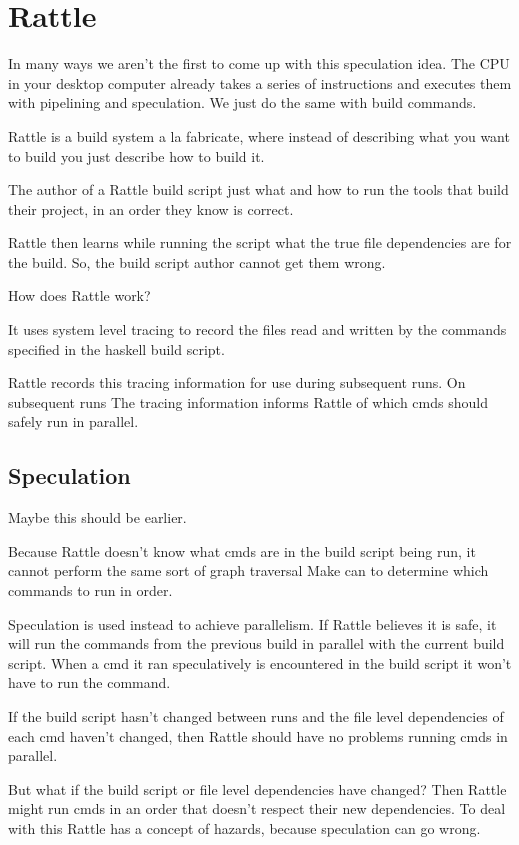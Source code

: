 \section{Rattle}
\label{sec:rattle}

In many ways we aren't the first to come up with this speculation idea. The CPU in your desktop computer already takes a series of instructions and executes them with pipelining and speculation. We just do the same with build commands.

Rattle is a build system a la fabricate, where instead of describing what you want to build
you just describe how to build it.

The author of a Rattle build script just what and how to run the tools that build their
project, in an order they know is correct.

Rattle then learns while running the script what the true file dependencies are for the build.
So, the build script author cannot get them wrong.

How does Rattle work?

It uses system level tracing to record the files read and written by the commands specified in
the haskell build script.

Rattle records this tracing information for use during subsequent runs.  On subsequent runs
The tracing information informs Rattle of which cmds should safely run in parallel.

\subsection{Speculation}

Maybe this should be earlier.

Because Rattle doesn't know what cmds are in the build script being run, it cannot perform
the same sort of graph traversal Make can to determine which commands to run in order.

Speculation is used instead to achieve parallelism.  If Rattle believes it is safe, it will run
the commands from the previous build in parallel with the current build script.  When a cmd it
ran speculatively is encountered in the build script it won't have to run the command.

If the build script hasn't changed between runs and the file level dependencies of each cmd
haven't changed, then Rattle should have no problems running cmds in parallel.

But what if the build script or file level dependencies have changed?  Then Rattle might
run cmds in an order that doesn't respect their new dependencies.  To deal with this Rattle
has a concept of hazards, because speculation can go wrong.


